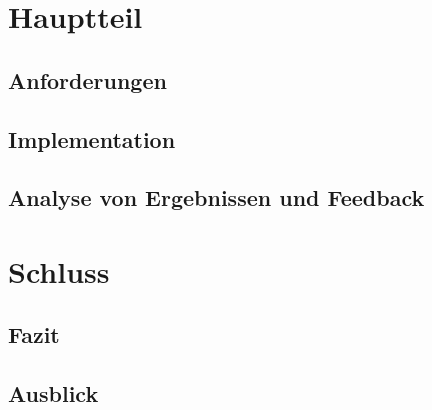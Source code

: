 \documentclass[12pt]{report}
\begin{document}
%
\chapter{Hauptteil}


\section{Anforderungen}


\section{Implementation}


\section{Analyse von Ergebnissen und Feedback}


%
\chapter{Schluss}


\section{Fazit}


\section{Ausblick}


\printbibliography[heading=bibnumbered]
\clearpage
\end{document}
